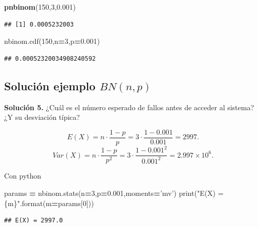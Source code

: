 \documentclass[]{book}
\newenvironment{Shaded}{\begin{snugshade}}{\end{snugshade}}
\newcommand{\BuiltInTok}[1]{#1}
\newcommand{\DecValTok}[1]{\textcolor[rgb]{0.00,0.00,0.81}{#1}}
\newcommand{\FloatTok}[1]{\textcolor[rgb]{0.00,0.00,0.81}{#1}}
\newcommand{\KeywordTok}[1]{\textcolor[rgb]{0.13,0.29,0.53}{\textbf{#1}}}
\newcommand{\NormalTok}[1]{#1}
\newcommand{\OperatorTok}[1]{\textcolor[rgb]{0.81,0.36,0.00}{\textbf{#1}}}
\newcommand{\SpecialCharTok}[1]{\textcolor[rgb]{0.00,0.00,0.00}{#1}}
\newcommand{\StringTok}[1]{\textcolor[rgb]{0.31,0.60,0.02}{#1}}
\begin{document}
\begin{Shaded}
\begin{Highlighting}[]
\KeywordTok{pnbinom}\NormalTok{(}\DecValTok{150}\NormalTok{,}\DecValTok{3}\NormalTok{,}\FloatTok{0.001}\NormalTok{)}
\end{Highlighting}
\end{Shaded}

\begin{verbatim}
## [1] 0.0005232003
\end{verbatim}

\begin{Shaded}
\begin{Highlighting}[]
\NormalTok{nbinom.cdf(}\DecValTok{150}\NormalTok{,n}\OperatorTok{=}\DecValTok{3}\NormalTok{,p}\OperatorTok{=}\FloatTok{0.001}\NormalTok{)}
\end{Highlighting}
\end{Shaded}

\begin{verbatim}
## 0.00052320034908240592
\end{verbatim}

\hypertarget{soluciuxf3n-ejemplo-bnnp-1}{%
\subsection{\texorpdfstring{Solución ejemplo \(BN(n,p)\)}{Solución ejemplo BN(n,p)}}\label{soluciuxf3n-ejemplo-bnnp-1}}

\textbf{Solución 5.} ¿Cuál es el número esperado de fallos antes de acceder al sistema? ¿Y su desviación típica?

\[E(X)=n\cdot \frac{1-p}{p}=3\cdot \frac{1- 0.001}{0.001}=2997.\]
\[Var(X)=n\cdot \frac{1-p}{p^2}=3\cdot \frac{1- 0.001^2}{0.001^2}=\ensuremath{2.997\times 10^{6}}.\]

Con python

\begin{Shaded}
\begin{Highlighting}[]
\NormalTok{params }\OperatorTok{=}\NormalTok{ nbinom.stats(n}\OperatorTok{=}\DecValTok{3}\NormalTok{,p}\OperatorTok{=}\FloatTok{0.001}\NormalTok{,moments}\OperatorTok{=}\StringTok{'mv'}\NormalTok{)}
\BuiltInTok{print}\NormalTok{(}\StringTok{"E(X) = }\SpecialCharTok{\{m\}}\StringTok{"}\NormalTok{.}\BuiltInTok{format}\NormalTok{(m}\OperatorTok{=}\NormalTok{params[}\DecValTok{0}\NormalTok{]))}
\end{Highlighting}
\end{Shaded}

\begin{verbatim}
## E(X) = 2997.0
\end{verbatim}
\end{document}
